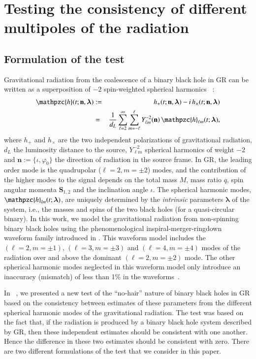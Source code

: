\documentclass[prd,preprintnumbers,twocolumn,eqsecnum,floatfix,a4paper,nofootinbib,superscriptaddress]{revtex4}
\newcommand{\h}{\mathpzc{h}}
\newcommand{\hlm}{\mathpzc{h}_{\ell m}}
\newcommand{\Ylm}{{Y}^{-2}_{\ell m}}
\newcommand{\blambda}{\bm{\lambda}}
\newcommand{\n}{\mathbf{n}}
\begin{document}
\section{Testing the consistency of different multipoles of the radiation}
\label{sec:test}

\subsection{Formulation of the test}

Gravitational radiation from the coalescence of a binary black hole in GR can be written as a superposition of $-2$ spin-weighted spherical harmonics ~\cite{NewmanPenrose}:
\begin{eqnarray}
\h(t; \n, \blambda) &:=& h_+(t; \n, \blambda) - i \, h_\times(t; \n, \blambda) \\
&=& \frac{1}{d_L} \sum _{\ell=2}^{\infty} \sum _{m=-\ell}^{\ell} {\Ylm} (\n) \, {{\hlm}(t; {\blambda})}, 
\label{eq:spherical_harmonics}
\end{eqnarray}
where $h_+$ and $h_{\times}$ are the two independent polarizations of gravitational radiation, $d_L$ the luminosity distance to the source, ${\Ylm}$ spherical harmonics of weight $-2$ and $\n := \{\iota, \varphi_0\}$ the direction of radiation in the source frame. In GR, the leading order mode is the quadrupolar ($\ell = 2, m = \pm 2$) modes, and the contribution of the higher modes to the signal depends on the total mass $M$, mass ratio $q$, spin angular momenta ${\mathbf S}_{1,2}$ and the inclination angle $\iota$.  The spherical harmonic modes, ${\h}_{lm}(t; \blambda)$, are uniquely determined by the \emph{intrinsic} parameters $\blambda$ of the system, i.e., the masses and spins of the two black holes (for a quasi-circular binary). In this work, we model the gravitational radiation from non-spinning binary black holes using the phenomenological inspiral-merger-ringdown waveform family introduced in \cite{Mehta:2017jpq}. This waveform model includes the $(\ell = 2, m=\pm1)$, $(\ell = 3, m=\pm3)$ and $(\ell = 4, m = \pm4)$  modes of the radiation over and above the dominant $(\ell = 2, m = \pm2)$ mode. The other spherical harmonic modes neglected in this waveform model only introduce an inaccuracy (mismatch) of less than 1\% in the waveforms~\cite{Mehta:2017jpq}. 

In ~\cite{Dhanpal:2018ufk}, we presented a new test of the ``no-hair'' nature of binary black holes in GR based on the consistency between estimates of these parameters from the different spherical harmonic modes of the gravitational radiation. The test was based on the fact that, if the radiation is produced by a binary black hole system described by GR, then these independent estimates should be consistent with one another. Hence the difference in these two estimates should be consistent with zero. There are two different formulations of the test that we consider in this paper.
\end{document}
